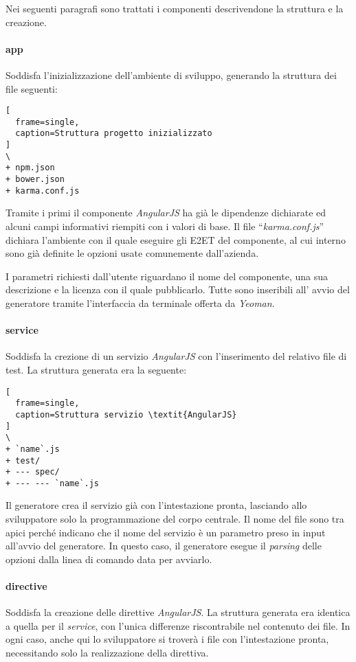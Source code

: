 Nei seguenti paragrafi sono trattati i componenti descrivendone la struttura e
la creazione.

\paragraph{app}
Soddisfa l'inizializzazione dell'ambiente di sviluppo, generando la struttura
dei file seguenti:
\begin{center}
\begin{lstlisting}[
  frame=single,
  caption=Struttura progetto inizializzato
]
\
+ npm.json
+ bower.json
+ karma.conf.js
\end{lstlisting}
\end{center}

Tramite i primi il componente \textit{AngularJS} ha già le dipendenze dichiarate
ed alcuni campi informativi riempiti con i valori di base. Il file
``\textit{karma.conf.js}'' dichiara l'ambiente con il quale eseguire gli
\gls{E2ET} del componente, al cui interno sono già definite le opzioni usate
comunemente dall'azienda.

I parametri richiesti dall'utente riguardano il nome del componente, una sua
descrizione e la licenza con il quale pubblicarlo. Tutte sono inseribili all'
avvio del generatore tramite l'interfaccia da terminale offerta da
\textit{Yeoman}.

\paragraph{service}
Soddisfa la crezione di un servizio \textit{AngularJS} con l'inserimento del
relativo file di test. La struttura generata era la seguente:
\begin{center}
\begin{lstlisting}[
  frame=single,
  caption=Struttura servizio \textit{AngularJS}
]
\
+ `name`.js
+ test/
+ --- spec/
+ --- --- `name`.js
\end{lstlisting}
\end{center}

Il generatore crea il servizio già con l'intestazione pronta, lasciando allo
sviluppatore solo la programmazione del corpo centrale. Il nome del file sono
tra apici perché indicano che il nome del servizio è un parametro preso in
input all'avvio del generatore. In questo caso, il generatore esegue il
\textit{parsing} delle opzioni dalla linea di comando data per avviarlo.

\paragraph{directive}
Soddisfa la creazione delle direttive \textit{AngularJS}. La struttura generata
era identica a quella per il \textit{service}, con l'unica differenze
riscontrabile nel contenuto dei file. In ogni caso, anche qui lo sviluppatore si
troverà i file con l'intestazione pronta, necessitando solo la realizzazione
della direttiva.

